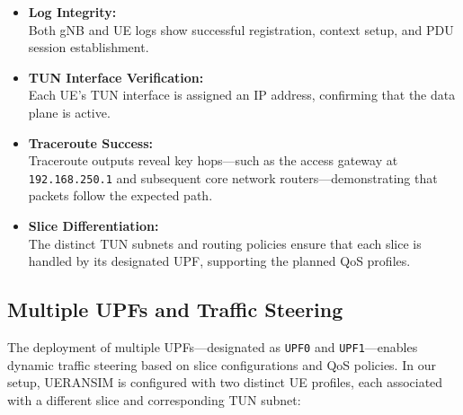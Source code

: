 \begin{itemize}
    \item \textbf{Log Integrity:}\\
    Both gNB and UE logs show successful registration, context setup, and 
    PDU session establishment.

    \item \textbf{TUN Interface Verification:}\\
    Each UE’s TUN interface is assigned an IP address, confirming that the 
    data plane is active.

    \item \textbf{Traceroute Success:}\\
    Traceroute outputs reveal key hops—such as the access gateway at 
    \texttt{192.168.250.1} and subsequent core network routers—demonstrating 
    that packets follow the expected path.

    \item \textbf{Slice Differentiation:}\\
    The distinct TUN subnets and routing policies ensure that each slice is 
    handled by its designated UPF, supporting the planned QoS profiles.
\end{itemize}

\subsection{Multiple UPFs and Traffic Steering}
\label{subsec:multiple-upfs}

The deployment of multiple UPFs—designated as \texttt{UPF0} and \texttt{UPF1}—enables 
dynamic traffic steering based on slice configurations and QoS policies. In our setup, 
UERANSIM is configured with two distinct UE profiles, each associated with a different 
slice and corresponding TUN subnet:


